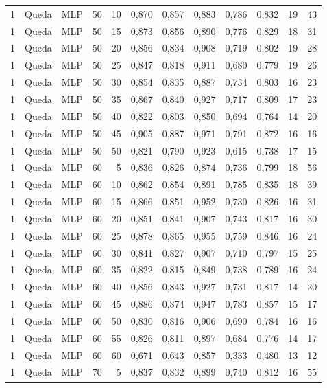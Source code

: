 \begin{longtable}{ccclrrrrrrrr}
1 & Queda & MLP & 50 & 10 & 0,870 & 0,857 & 0,883 & 0,786 & 0,832 & 19 & 43 \\
1 & Queda & MLP & 50 & 15 & 0,873 & 0,856 & 0,890 & 0,776 & 0,829 & 18 & 31 \\
1 & Queda & MLP & 50 & 20 & 0,856 & 0,834 & 0,908 & 0,719 & 0,802 & 19 & 28 \\
1 & Queda & MLP & 50 & 25 & 0,847 & 0,818 & 0,911 & 0,680 & 0,779 & 19 & 26 \\
1 & Queda & MLP & 50 & 30 & 0,854 & 0,835 & 0,887 & 0,734 & 0,803 & 16 & 23 \\
1 & Queda & MLP & 50 & 35 & 0,867 & 0,840 & 0,927 & 0,717 & 0,809 & 17 & 23 \\
1 & Queda & MLP & 50 & 40 & 0,822 & 0,803 & 0,850 & 0,694 & 0,764 & 14 & 20 \\
1 & Queda & MLP & 50 & 45 & 0,905 & 0,887 & 0,971 & 0,791 & 0,872 & 16 & 16 \\
1 & Queda & MLP & 50 & 50 & 0,821 & 0,790 & 0,923 & 0,615 & 0,738 & 17 & 15 \\
1 & Queda & MLP & 60 & 5 & 0,836 & 0,826 & 0,874 & 0,736 & 0,799 & 18 & 56 \\
1 & Queda & MLP & 60 & 10 & 0,862 & 0,854 & 0,891 & 0,785 & 0,835 & 18 & 39 \\
1 & Queda & MLP & 60 & 15 & 0,866 & 0,851 & 0,952 & 0,730 & 0,826 & 16 & 31 \\
1 & Queda & MLP & 60 & 20 & 0,851 & 0,841 & 0,907 & 0,743 & 0,817 & 16 & 30 \\
1 & Queda & MLP & 60 & 25 & 0,878 & 0,865 & 0,955 & 0,759 & 0,846 & 16 & 24 \\
1 & Queda & MLP & 60 & 30 & 0,841 & 0,827 & 0,907 & 0,710 & 0,797 & 15 & 25 \\
1 & Queda & MLP & 60 & 35 & 0,822 & 0,815 & 0,849 & 0,738 & 0,789 & 16 & 24 \\
1 & Queda & MLP & 60 & 40 & 0,856 & 0,843 & 0,927 & 0,731 & 0,817 & 14 & 20 \\
1 & Queda & MLP & 60 & 45 & 0,886 & 0,874 & 0,947 & 0,783 & 0,857 & 15 & 17 \\
1 & Queda & MLP & 60 & 50 & 0,830 & 0,816 & 0,906 & 0,690 & 0,784 & 16 & 16 \\
1 & Queda & MLP & 60 & 55 & 0,826 & 0,811 & 0,897 & 0,684 & 0,776 & 14 & 17 \\
1 & Queda & MLP & 60 & 60 & 0,671 & 0,643 & 0,857 & 0,333 & 0,480 & 13 & 12 \\
1 & Queda & MLP & 70 & 5 & 0,837 & 0,832 & 0,899 & 0,740 & 0,812 & 16 & 55 \\

\end{longtable}
